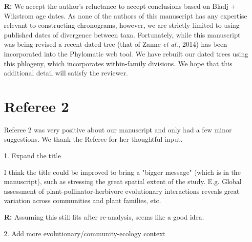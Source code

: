 \documentclass[12pt]{letter}
\newenvironment{refquote}{\bigskip \begin{it}}{\end{it}\smallskip}
\begin{document}
      \textbf{R:} We accept the author's reluctance to accept conclusions based on Bladj + Wikstrom age dates. As none of the authors of this manuscript has any expertise relevant to constructing chronograms, however, we are strictly limited to using published dates of divergence between taxa. Fortunately, while this manuscript was being revised a recent dated tree (that of Zanne \emph{et al.}, 2014) has been incorporated into the Phylomatic web tool. We have rebuilt our dated trees using this phlogeny, which incorporates within-family divisions. We hope that this additional detail will satisfy the reviewer.


\section*{Referee 2}

  Referee 2 was very positive about our manuscript and only had a few minor suggestions. We thank the Referee for her thoughtful input.

  1. Expand the title

    \begin{refquote}

      I think the title could be improved to bring a "bigger message" (which is in the manuscript), such as stressing the great spatial extent of the study. E.g. Global assessment of plant-pollinator-herbivore evolutionary interactions reveals great variation across communities and plant families, etc.

    \end{refquote}

    \textbf{R:} Assuming this still fits after re-analysis, seems like a good idea.

  2. Add more evolutionary/community-ecology context
\end{document}
